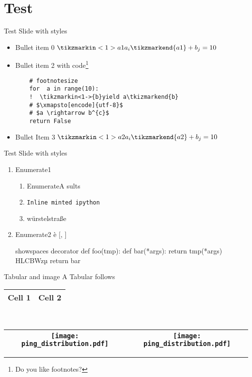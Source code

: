 
\section{Test}

\begin{frame}[fragile]{Test Slide with styles}
\begin{itemize}
\item Bullet item 0 $\tikzmarkin<1>{a1}a_i\tikzmarkend{a1} + b_j = 10 $
\item Bullet item 2 with code\footnote{Do you like footnotes?}
\begin{verbatim}
    # footnotesize
    for  a in range(10):
    !  \tikzmarkin<1->{b}yield a\tkizmarkend{b}
    # $\xmapsto[encode]{utf-8}$
    # $a \rightarrow b^{c}$
    return False
\end{verbatim}
\item Bullet Item 3 $\tikzmarkin<1>{a2}a_i\tikzmarkend{a2} + b_j = 10 $
\end{itemize}
\end{frame}

\begin{frame}[fragile]{Test Slide with styles}
\begin{enumerate}
\item Enumerate1
    \begin{enumerate}
    \item EnumerateA  sults
    \item \texttt{Inline minted ipython}
    \item w\"urstelstra\ss e
    \end{enumerate}

\item Enumerate2 \`{e} 
 [, ] 
\begin{pythoncode*}{showspaces}
  \@ decorator
  def foo(tmp):
    def bar(*args):
        return tmp(*args)
    HLCBWzµ return bar
\end{pythoncode*}

\end{enumerate}

\end{frame}

\begin{frame}[fragile]{Tabular and image}
A Tabular follows \\
\begin{tabular}{|c|c|}\hline
Cell 1 & Cell 2 \\
\hline 
\end{tabular}
\\
\begin{table}
\begin{tabular}{|c|c|}\hline
\texttt{[image: ping\_distribution.pdf]}   & \texttt{[image: ping\_distribution.pdf]}  \\
\hline 
\end{tabular}
\end{table}
\end{frame}

